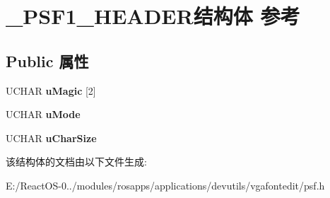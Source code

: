 \hypertarget{struct___p_s_f1___h_e_a_d_e_r}{}\section{\+\_\+\+P\+S\+F1\+\_\+\+H\+E\+A\+D\+E\+R结构体 参考}
\label{struct___p_s_f1___h_e_a_d_e_r}
\subsection*{Public 属性}
\begin{DoxyCompactItemize}
\item 
\mbox{\label{struct___p_s_f1___h_e_a_d_e_r_a6b29ab15e2fe71faf70faef126d6008b}} 
U\+C\+H\+AR {\bfseries u\+Magic} \mbox{[}2\mbox{]}
\item 
\mbox{\label{struct___p_s_f1___h_e_a_d_e_r_a09aad57211347b06a1ee0195f7d43921}} 
U\+C\+H\+AR {\bfseries u\+Mode}
\item 
\mbox{\label{struct___p_s_f1___h_e_a_d_e_r_a452323924166bbaf714fa83d2f3a4dd0}} 
U\+C\+H\+AR {\bfseries u\+Char\+Size}
\end{DoxyCompactItemize}


该结构体的文档由以下文件生成\+:\begin{DoxyCompactItemize}
\item 
E\+:/\+React\+O\+S-\/0../modules/rosapps/applications/devutils/vgafontedit/psf.\+h\end{DoxyCompactItemize}
